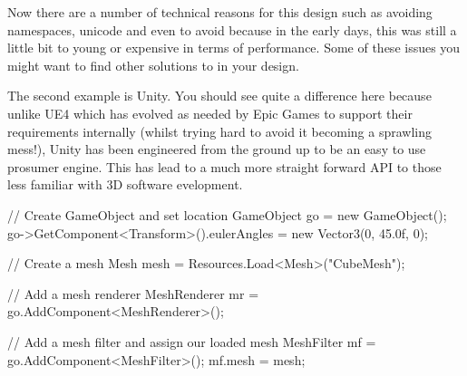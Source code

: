 \documentclass[10pt]{article}
\begin{document}
Now there are a number of technical reasons for this design such as
avoiding namespaces, unicode and even to avoid  because
in the early days, this was still a little bit to young or expensive in
terms of performance. Some of these issues you might want to find other
solutions to in your design.


The second example is Unity. You should see quite a difference here
because unlike UE4 which has evolved as needed by Epic Games to support
their requirements internally (whilst trying hard to avoid it becoming
a sprawling mess!), Unity has been engineered from the ground up to be
an easy to use prosumer engine. This has lead to a much more straight
forward API to those less familiar with 3D software evelopment.

\begin{Code}

// Create GameObject and set location
GameObject go = new GameObject();
go->GetComponent<Transform>().eulerAngles = new Vector3(0, 45.0f, 0);

// Create a mesh
Mesh mesh = Resources.Load<Mesh>("CubeMesh");

// Add a mesh renderer
MeshRenderer mr = go.AddComponent<MeshRenderer>();

// Add a mesh filter and assign our loaded mesh
MeshFilter mf = go.AddComponent<MeshFilter>();
mf.mesh = mesh;

\end{Code}
\end{document}
